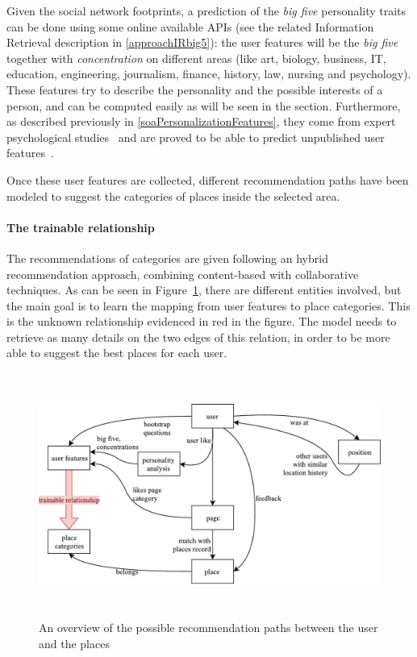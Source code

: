 Given the social network footprints, a prediction of the \textit{big five} personality traits can be done using some online available APIs (see the related Information Retrieval description in \ref{approachIRbig5}): the user features will be the \textit{big five} together with \textit{concentration} on different areas (like art, biology, business, IT, education, engineering, journalism, finance, history, law, nursing and psychology). These features try to describe the personality and the possible interests of a person, and can be computed easily as will be seen in the section. Furthermore, as described previously in \ref{soaPersonalizationFeatures}, they come from expert psychological studies~\cite{costa2008revised} and are proved to be able to predict unpublished user features~\cite{kosinski2013private}.

Once these user features are collected, different recommendation paths have been modeled to suggest the categories of places inside the selected area.

\paragraph{The trainable relationship}
The recommendations of categories are given following an hybrid recommendation approach, combining content-based with collaborative techniques. As can be seen in Figure~\ref{fig:recommendationPaths}, there are different entities involved, but the main goal is to learn the mapping from user features to place categories. This is the unknown relationship evidenced in red in the figure. The model needs to retrieve as many details on the two edges of this relation, in order to be more able to suggest the best places for each user.


\begin{figure}[!htbp]
    \centering
    \includegraphics[max width=\linewidth,max height=8cm,keepaspectratio]{figures/recommendationPaths}
    \caption{An overview of the possible recommendation paths between the user and the places}\label{fig:recommendationPaths}
\end{figure}

